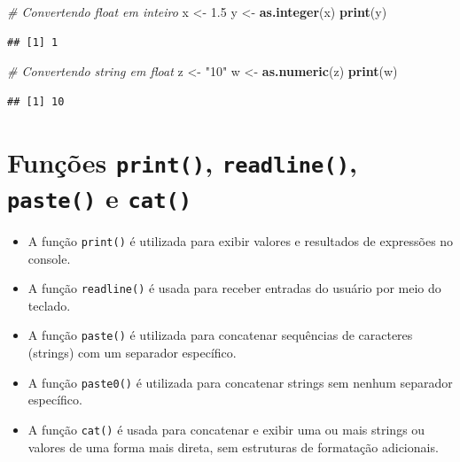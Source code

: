 \documentclass[
]{book}
\newenvironment{Shaded}{\begin{snugshade}}{\end{snugshade}}
\newcommand{\CommentTok}[1]{\textcolor[rgb]{0.56,0.35,0.01}{\textit{#1}}}
\newcommand{\FloatTok}[1]{\textcolor[rgb]{0.00,0.00,0.81}{#1}}
\newcommand{\FunctionTok}[1]{\textcolor[rgb]{0.13,0.29,0.53}{\textbf{#1}}}
\newcommand{\NormalTok}[1]{#1}
\newcommand{\OtherTok}[1]{\textcolor[rgb]{0.56,0.35,0.01}{#1}}
\newcommand{\StringTok}[1]{\textcolor[rgb]{0.31,0.60,0.02}{#1}}
\begin{document}
\begin{Shaded}
\begin{Highlighting}[]
\CommentTok{\# Convertendo float em inteiro}
\NormalTok{x }\OtherTok{\textless{}{-}} \FloatTok{1.5}
\NormalTok{y }\OtherTok{\textless{}{-}} \FunctionTok{as.integer}\NormalTok{(x)}
\FunctionTok{print}\NormalTok{(y)}
\end{Highlighting}
\end{Shaded}

\begin{verbatim}
## [1] 1
\end{verbatim}

\begin{Shaded}
\begin{Highlighting}[]
\CommentTok{\# Convertendo string em float}
\NormalTok{z }\OtherTok{\textless{}{-}} \StringTok{"10"}
\NormalTok{w }\OtherTok{\textless{}{-}} \FunctionTok{as.numeric}\NormalTok{(z)}
\FunctionTok{print}\NormalTok{(w)}
\end{Highlighting}
\end{Shaded}

\begin{verbatim}
## [1] 10
\end{verbatim}

\section{\texorpdfstring{Funções \texttt{print()}, \texttt{readline()}, \texttt{paste()} e \texttt{cat()}}{Funções print(), readline(), paste() e cat()}}\label{funuxe7uxf5es-print-readline-paste-e-cat}

\begin{itemize}
\item
  A função \texttt{print()} é utilizada para exibir valores e resultados de expressões no console.
\item
  A função \texttt{readline()} é usada para receber entradas do usuário por meio do teclado.
\item
  A função \texttt{paste()} é utilizada para concatenar sequências de caracteres (strings) com um separador específico.
\item
  A função \texttt{paste0()} é utilizada para concatenar strings sem nenhum separador específico.
\item
  A função \texttt{cat()} é usada para concatenar e exibir uma ou mais strings ou valores de uma forma mais direta, sem estruturas de formatação adicionais.
\end{itemize}
\end{document}
